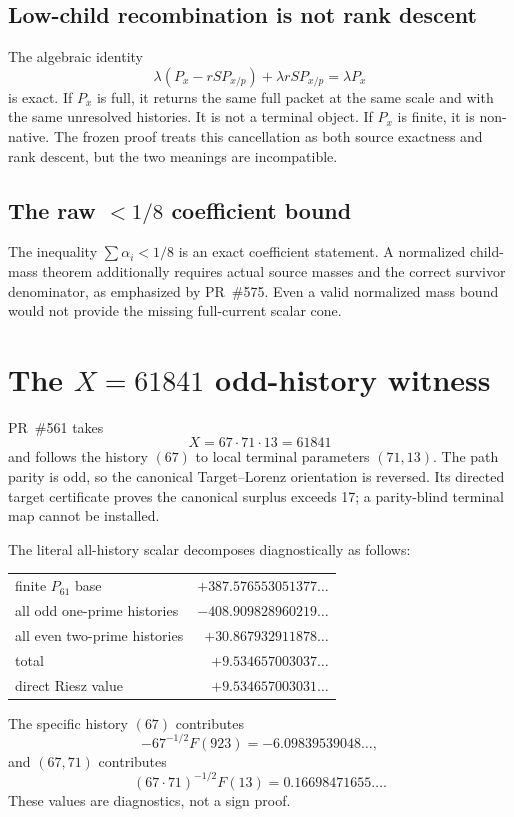 \documentclass[11pt]{article}
\begin{document}
\subsection{Low-child recombination is not rank descent}
The algebraic identity
\[
 \lambda(P_x-rSP_{x/p})+\lambda rSP_{x/p}=\lambda P_x
\]
is exact.  If $P_x$ is full, it returns the same full packet at the same scale and with the same unresolved histories.  It is not a terminal object.  If $P_x$ is finite, it is non-native.  The frozen proof treats this cancellation as both source exactness and rank descent, but the two meanings are incompatible.

\subsection{The raw $<1/8$ coefficient bound}
The inequality $\sum\alpha_i<1/8$ is an exact coefficient statement.  A normalized child-mass theorem additionally requires actual source masses and the correct survivor denominator, as emphasized by PR~\#575.  Even a valid normalized mass bound would not provide the missing full-current scalar cone.

\section{The $X=61841$ odd-history witness}
PR~\#561 takes
\[
 X=67\cdot71\cdot13=61841
\]
and follows the history $(67)$ to local terminal parameters $(71,13)$.  The path parity is odd, so the canonical Target--Lorenz orientation is reversed.  Its directed target certificate proves the canonical surplus exceeds 17; a parity-blind terminal map cannot be installed.

The literal all-history scalar decomposes diagnostically as follows:
\begin{center}
\begin{tabular}{lr}
\toprule
finite $P_{61}$ base & $+387.576553051377\ldots$ \\
all odd one-prime histories & $-408.909828960219\ldots$ \\
all even two-prime histories & $+30.867932911878\ldots$ \\
\midrule
total & $+9.534657003037\ldots$ \\
direct Riesz value & $+9.534657003031\ldots$ \\
\bottomrule
\end{tabular}
\end{center}
The specific history $(67)$ contributes
\[
 -67^{-1/2}F(923)=-6.09839539048\ldots,
\]
and $(67,71)$ contributes
\[
 (67\cdot71)^{-1/2}F(13)=0.16698471655\ldots.
\]
These values are diagnostics, not a sign proof.
\end{document}

